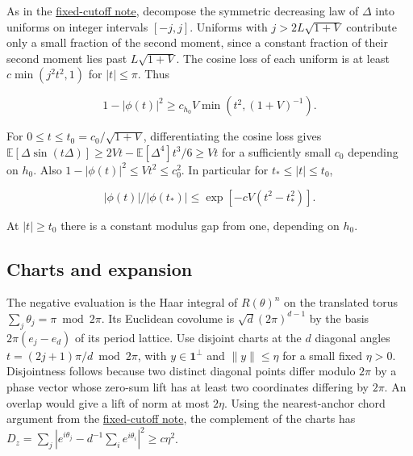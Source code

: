 As in the \href{https://github.com/ProgramComputer/open-math-research/blob/04564a728c21eab6ce511b98a48ccaac754648ff/topics/balanced-arrays/very-tall/very-tall-interior-saddle.md}{fixed-cutoff note}, decompose the symmetric decreasing law of $\Delta$ into uniforms on integer intervals $[-j,j]$. Uniforms with $j>2L\sqrt{1+V}$ contribute only a small fraction of the second moment, since a constant fraction of their second moment lies past $L\sqrt{1+V}$. The cosine loss of each uniform is at least $c\min(j^2t^2,1)$ for $|t|\le\pi$. Thus

\begin{equation*}
1-|\phi(t)|^2\ge c_{h_0}V\min(t^2,(1+V)^{-1}).
\end{equation*}

For $0\le t\le t_0=c_0/\sqrt{1+V}$, differentiating the cosine loss gives $\mathbb E[\Delta\sin(t\Delta)]\ge 2Vt-\mathbb E[\Delta^4]t^3/6\ge Vt$ for a sufficiently small $c_0$ depending on $h_0$. Also $1-|\phi(t)|^2\le Vt^2\le c_0^2$. In particular for $t_*\le |t|\le t_0$,

\begin{equation*}
|\phi(t)|/|\phi(t_*)|\le\exp[-c V(t^2-t_*^2)].
\end{equation*}

At $|t|\ge t_0$ there is a constant modulus gap from one, depending on $h_0$.

\subsection{Charts and expansion}

The negative evaluation is the Haar integral of $R(\theta)^n$ on the translated torus $\sum_j\theta_j=\pi\bmod 2\pi$. Its Euclidean covolume is $\sqrt d(2\pi)^{d-1}$ by the basis $2\pi(e_j-e_d)$ of its period lattice. Use disjoint charts at the $d$ diagonal angles $t=(2j+1)\pi/d\bmod 2\pi$, with $y\in \mathbf1^\perp$ and $\|y\|\le\eta$ for a small fixed $\eta>0$. Disjointness follows because two distinct diagonal points differ modulo $2\pi$ by a phase vector whose zero-sum lift has at least two coordinates differing by $2\pi$. An overlap would give a lift of norm at most $2\eta$. Using the nearest-anchor chord argument from the \href{https://github.com/ProgramComputer/open-math-research/blob/04564a728c21eab6ce511b98a48ccaac754648ff/topics/balanced-arrays/very-tall/very-tall-interior-saddle.md}{fixed-cutoff note}, the complement of the charts has $D_z=\sum_j|e^{i\theta_j}-d^{-1}\sum_i e^{i\theta_i}|^2\ge c\eta^2$.

